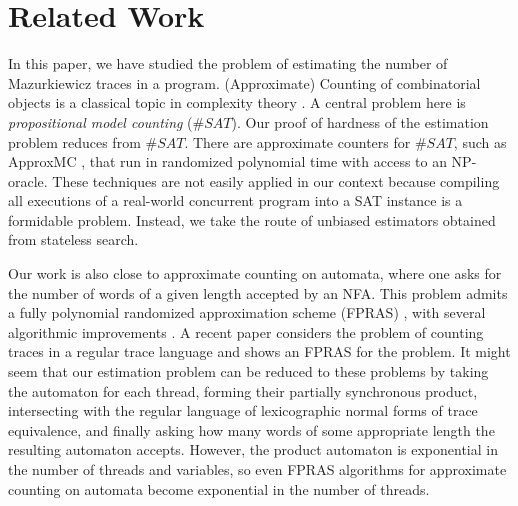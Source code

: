 
\section{Related Work}

In this paper, we have studied the problem of estimating the number of Mazurkiewicz traces in a program. 
(Approximate) Counting of combinatorial objects is a classical topic in complexity theory \cite{Valiant79,JerrumVV86}.
A central problem here is \emph{propositional model counting} ($\#SAT$).
Our proof of hardness of the estimation problem reduces from $\#SAT$.
There are approximate counters for $\#SAT$, such as ApproxMC \cite{chakraborty2013scalableapproximatemodelcounter}, that run in randomized polynomial time with access to
an NP-oracle.
These techniques are not easily applied in our context because compiling all executions of a real-world concurrent program into a SAT instance is a formidable problem.
Instead, we take the route of unbiased estimators obtained from stateless search.

Our work is also close to approximate counting on automata, where one asks for the number of words of a given length accepted by an NFA. 
This problem admits a fully polynomial randomized approximation scheme (FPRAS) \cite{GoreJKSM97,10.1145/3422648.3422661}, 
with several algorithmic improvements \cite{meel2024fasterfprasnfa,meel2025practicalfprasnfaexploiting}.
A recent paper \cite{ColnetMM26} considers the problem of counting traces in a regular trace language and shows an FPRAS for the problem.
It might seem that our estimation problem can be reduced to these problems by taking the automaton for each thread, forming their partially synchronous product, 
intersecting with the regular language of lexicographic normal forms of trace equivalence, and finally asking how many words of some appropriate length the resulting automaton accepts. 
However, the product automaton is exponential in the number of threads and variables, so even FPRAS algorithms for approximate counting on automata become exponential in the number of threads. 

